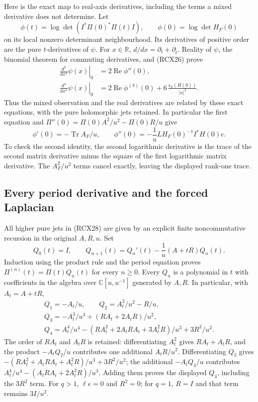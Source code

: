Here is the exact map to real-axis derivatives, including the
terms a mixed derivative does not determine. Let
\[
 \phi(t)=\log\det\!\left(I^*\Pi(0)^*\Pi(t)I\right),
 \qquad \phi(0)=\log\det H_F(0)
 \tag{RCX27}
\]
on its local nonzero determinant neighbourhood. Its derivatives
of positive order are the pure \(t\)-derivatives of \(\psi\).
For \(x\in\mathbb R\), \(d/dx=\partial_t+\partial_{\bar t}\).
Reality of \(\psi\), the binomial theorem for commuting derivatives,
and (RCX26) prove
\[
\begin{split}
 \left.\frac{d^2}{dx^2}\psi(x)\right|_0
   &=2\operatorname{Re}\phi''(0),\\
 \left.\frac{d^4}{dx^4}\psi(x)\right|_0
   &=2\operatorname{Re}\phi^{(4)}(0)
       +6\,\frac{\mathfrak c_F(H(0))}{|u|^2}.
\end{split}\tag{RCX28}
\]
Thus the mixed observation and the real derivatives are related
by these exact equations, with the pure holomorphic jets retained.
In particular the first equation and
\(\Pi''(0)=\Pi(0)A^2/u^2-\Pi(0)R/u\) give
\[
 \phi'(0)=-\operatorname{Tr}A_F/u,\qquad
 \phi''(0)=-\frac1u L H_F(0)^{-1}I^*H(0)e .
 \tag{RCX29}
\]
To check the second identity, the second logarithmic derivative
is the trace of the second matrix derivative minus the square
of the first logarithmic matrix derivative. The \(A_F^2/u^2\)
terms cancel exactly, leaving the displayed rank-one trace.

\subsection{Every period derivative and the forced Laplacian}

All higher pure jets in (RCX28) are given by an explicit finite
noncommutative recursion in the original \(A,R,u\). Set
\[
 Q_0(t)=I,\qquad
 Q_{n+1}(t)=Q_n'(t)-\frac1u(A+tR)Q_n(t).
 \tag{RCX30}
\]
Induction using the product rule and the period equation proves
\(\Pi^{(n)}(t)=\Pi(t)Q_n(t)\) for every \(n\ge0\).
Every \(Q_n\) is a polynomial in \(t\) with coefficients in the
algebra over \(\mathbb C[u,u^{-1}]\) generated by \(A,R\).
In particular, with \(A_t=A+tR\),
\[
 \begin{gathered}
 Q_1=-A_t/u,\qquad Q_2=A_t^2/u^2-R/u,\\
 Q_3=-A_t^3/u^3+(RA_t+2A_tR)/u^2,\\
 Q_4=A_t^4/u^4
       -(RA_t^2+2A_tRA_t+3A_t^2R)/u^3+3R^2/u^2 .
 \end{gathered}
 \tag{RCX31}
\]
The order of \(RA_t\) and \(A_tR\) is retained: differentiating
\(A_t^2\) gives \(RA_t+A_tR\), and the product
\(-A_tQ_2/u\) contributes one additional \(A_tR/u^2\).
Differentiating \(Q_3\) gives
\(-(RA_t^2+A_tRA_t+A_t^2R)/u^3+3R^2/u^2\);
the additional \(-A_tQ_3/u\) contributes
\(A_t^4/u^4-(A_tRA_t+2A_t^2R)/u^3\).
Adding them proves the displayed \(Q_4\), including the \(3R^2\)
term. For \(q>1\), \(\ell e=0\) and \(R^2=0\); for \(q=1\),
\(R=I\) and that term remains \(3I/u^2\).

